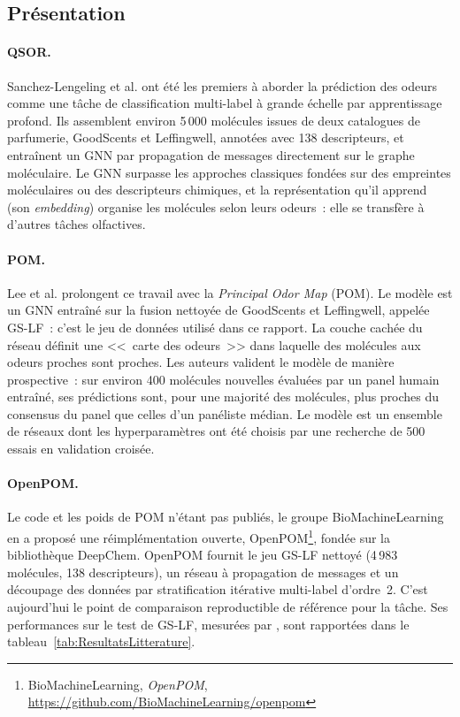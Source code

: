 \subsection{Présentation}

\paragraph{QSOR.}
Sanchez-Lengeling et al. \cite{SanchezLengeling-2019} ont été les premiers à aborder la prédiction des odeurs comme une tâche de classification multi-label à grande échelle par apprentissage profond.
Ils assemblent environ 5\,000 molécules issues de deux catalogues de parfumerie, GoodScents et Leffingwell, annotées avec 138 descripteurs, et entraînent un GNN par propagation de messages directement sur le graphe moléculaire.
Le GNN surpasse les approches classiques fondées sur des empreintes moléculaires ou des descripteurs chimiques, et la représentation qu'il apprend (son \emph{embedding}) organise les molécules selon leurs odeurs~: elle se transfère à d'autres tâches olfactives.

\paragraph{POM.}
Lee et al. \cite{Lee-2023} prolongent ce travail avec la \emph{Principal Odor Map} (POM).
Le modèle est un GNN entraîné sur la fusion nettoyée de GoodScents et Leffingwell, appelée GS-LF~: c'est le jeu de données utilisé dans ce rapport.
La couche cachée du réseau définit une <<~carte des odeurs~>> dans laquelle des molécules aux odeurs proches sont proches.
Les auteurs valident le modèle de manière prospective~: sur environ 400 molécules nouvelles évaluées par un panel humain entraîné, ses prédictions sont, pour une majorité des molécules, plus proches du consensus du panel que celles d'un panéliste médian.
Le modèle est un ensemble de réseaux dont les hyperparamètres ont été choisis par une recherche de 500 essais en validation croisée.

\paragraph{OpenPOM.}
Le code et les poids de POM n'étant pas publiés, le groupe BioMachineLearning en a proposé une réimplémentation ouverte, OpenPOM\footnote{BioMachineLearning, \emph{OpenPOM}, \url{https://github.com/BioMachineLearning/openpom}}, fondée sur la bibliothèque DeepChem.
OpenPOM fournit le jeu GS-LF nettoyé (4\,983 molécules, 138 descripteurs), un réseau à propagation de messages et un découpage des données par stratification itérative multi-label d'ordre~2.
C'est aujourd'hui le point de comparaison reproductible de référence pour la tâche.
Ses performances sur le test de GS-LF, mesurées par \cite{Han-2026}, sont rapportées dans le tableau~\ref{tab:ResultatsLitterature}.

